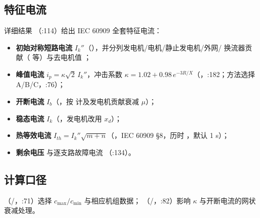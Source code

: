\subsection{特征电流}
详细结果 （:114）给出 IEC 60909 全套特征电流：
\begin{itemize}
  \item \textbf{初始对称短路电流} $I_k''$（），并分列发电机/电机/静止发电机/外网/
        换流器贡献（ 等）与去电机值 ；
  \item \textbf{峰值电流} $i_p=\kappa\sqrt2\,I_k''$，冲击系数
        $\kappa=1.02+0.98\,e^{-3R/X}$（，:182；方法选择
         A/B/C，:76）；
  \item \textbf{开断电流} $I_b$（，按  计及发电机贡献衰减 $\mu$）；
  \item \textbf{稳态电流} $I_k$（，发电机改用 $x_d$）；
  \item \textbf{热等效电流} $I_{th}=I_k''\sqrt{m+n}$（，IEC 60909 §8，历时
        ，默认 1 s）；
  \item \textbf{剩余电压}  与逐支路故障电流 （:134）。
\end{itemize}

\subsection{计算口径}
（/，:71）选择 $c_{\max}/c_{\min}$ 与相应机组数据；
（/，:82）影响 $\kappa$ 与开断电流的网状衰减处理。
